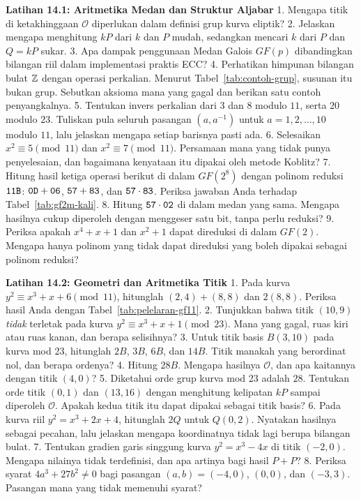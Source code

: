 
\begin{obereflection}
\textbf{Latihan 14.1: Aritmetika Medan dan Struktur Aljabar}
1. Mengapa titik di ketakhinggaan $\mathcal{O}$ diperlukan dalam definisi grup
   kurva eliptik?
2. Jelaskan mengapa menghitung $kP$ dari $k$ dan $P$ mudah, sedangkan mencari
   $k$ dari $P$ dan $Q = kP$ sukar.
3. Apa dampak penggunaan Medan Galois $GF(p)$ dibandingkan bilangan riil dalam
   implementasi praktis ECC?
4. Perhatikan himpunan bilangan bulat $\mathbb{Z}$ dengan operasi perkalian. Menurut
   Tabel~\ref{tab:contoh-grup}, susunan itu bukan grup. Sebutkan aksioma mana
   yang gagal dan berikan satu contoh penyangkalnya.
5. Tentukan invers perkalian dari $3$ dan $8$ modulo $11$, serta $20$ modulo
   $23$. Tuliskan pula seluruh pasangan $(a, a^{-1})$ untuk $a = 1, 2, \dots,
   10$ modulo $11$, lalu jelaskan mengapa setiap barisnya pasti ada.
6. Selesaikan $x^2 \equiv 5 \pmod{11}$ dan $x^2 \equiv 7 \pmod{11}$. Persamaan
   mana yang tidak punya penyelesaian, dan bagaimana kenyataan itu dipakai
   oleh metode Koblitz?
7. Hitung hasil ketiga operasi berikut di dalam $GF(2^8)$ dengan polinom
   reduksi $\texttt{11B}$: $\texttt{0D} + \texttt{06}$, $\texttt{57} + \texttt{83}$, dan
   $\texttt{57} \cdot \texttt{83}$. Periksa jawaban Anda terhadap
   Tabel~\ref{tab:gf2m-kali}.
8. Hitung $\texttt{57} \cdot \texttt{02}$ di dalam medan yang sama. Mengapa
   hasilnya cukup diperoleh dengan menggeser satu bit, tanpa perlu reduksi?
9. Periksa apakah $x^4 + x + 1$ dan $x^2 + 1$ dapat direduksi di dalam $GF(2)$.
   Mengapa hanya polinom yang tidak dapat direduksi yang boleh dipakai sebagai
   polinom reduksi?
\end{obereflection}

\begin{obereflection}
\textbf{Latihan 14.2: Geometri dan Aritmetika Titik}
1. Pada kurva $y^2 \equiv x^3 + x + 6 \pmod{11}$, hitunglah $(2,4) + (8,8)$ dan
   $2(8,8)$. Periksa hasil Anda dengan Tabel~\ref{tab:pelelaran-gf11}.
2. Tunjukkan bahwa titik $(10, 9)$ \emph{tidak} terletak pada kurva
   $y^2 \equiv x^3 + x + 1 \pmod{23}$. Mana yang gagal, ruas kiri atau ruas
   kanan, dan berapa selisihnya?
3. Untuk titik basis $B(3,10)$ pada kurva mod 23, hitunglah $2B$, $3B$, $6B$,
   dan $14B$. Titik manakah yang berordinat nol, dan berapa ordenya?
4. Hitung $28B$. Mengapa hasilnya $\mathcal{O}$, dan apa kaitannya dengan
   titik $(4,0)$?
5. Diketahui orde grup kurva mod 23 adalah $28$. Tentukan orde titik $(0,1)$
   dan $(13,16)$ dengan menghitung kelipatan $kP$ sampai diperoleh
   $\mathcal{O}$. Apakah kedua titik itu dapat dipakai sebagai titik basis?
6. Pada kurva riil $y^2 = x^3 + 2x + 4$, hitunglah $2Q$ untuk $Q(0,2)$.
   Nyatakan hasilnya sebagai pecahan, lalu jelaskan mengapa koordinatnya tidak
   lagi berupa bilangan bulat.
7. Tentukan gradien garis singgung kurva $y^2 = x^3 - 4x$ di titik $(-2, 0)$.
   Mengapa nilainya tidak terdefinisi, dan apa artinya bagi hasil $P + P$?
8. Periksa syarat $4a^3 + 27b^2 \neq 0$ bagi pasangan $(a,b) = (-4, 0)$,
   $(0, 0)$, dan $(-3, 3)$. Pasangan mana yang tidak memenuhi syarat?
\end{obereflection}

